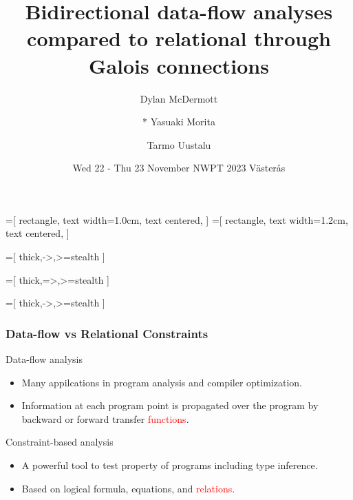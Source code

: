 \documentclass{beamer}
\title{Bidirectional data-flow analyses compared to relational through Galois connections}
\author{
  Dylan McDermott
\and
  * Yasuaki Morita
\and
  Tarmo Uustalu
}
\institute{Reykjavik University}
\date{Wed 22 - Thu 23 November NWPT 2023 V{\"a}ster{\aa}s }
\newcommand{\red}[1]{\textcolor{red}{#1}}
\begin{document}
\begin{frame}
  \titlepage
\end{frame}

\usetikzlibrary{shapes,arrows}

=[
  rectangle,
  text width=1.0cm,
  text centered,
]
=[
  rectangle,
  text width=1.2cm,
  text centered,
]

=[
  thick,->,>=stealth
]

=[
  thick,=>,>=stealth
]

=[
  thick,->,>=stealth
]

\newcommand{\agenda}{}

\agenda
\begin{frame}
  \frametitle {Data-flow vs Relational Constraints}
  \begin{block}{Data-flow analysis}
    \begin{itemize}
    \item Many appilcations in program analysis and compiler optimization.
    \item Information at each program point is propagated over the program by backward or forward transfer \red{functions}.
    \end{itemize}
  \end{block}
  \begin{block}{Constraint-based analysis}
    \begin{itemize}
    \item A powerful tool to test property of programs including type inference.
    \item Based on logical formula, equations, and \red{relations}.
    \end{itemize}
  \end{block}
\end{frame}
\end{document}
